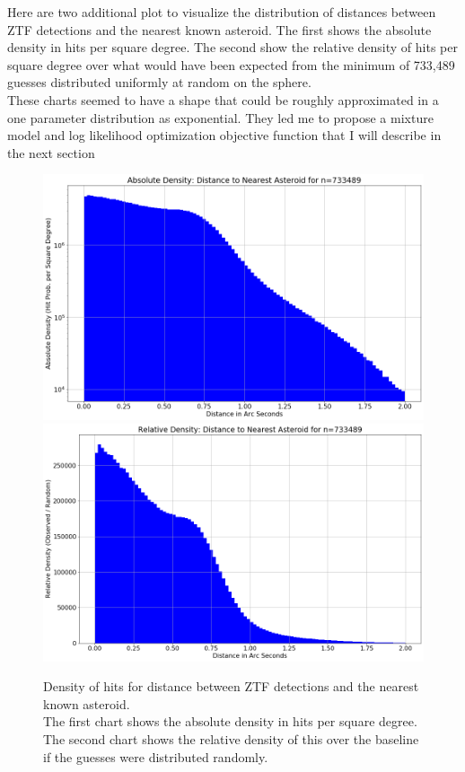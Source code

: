 Here are two additional plot to visualize the distribution of distances between ZTF detections and the nearest known asteroid.
The first shows the absolute density in hits per square degree.
The second show the relative density of hits per square degree over what would have been expected
from the minimum of 733,489 guesses distributed uniformly at random on the sphere. \\
These charts seemed to have a shape that could be roughly approximated in a one parameter distribution as exponential.
They led me to propose a mixture model and log likelihood optimization objective function that I will describe in the next section
\begin{figure}[hbt!]
\begin{center}
\includegraphics[width=1.0\textwidth]{../figs/ztf/nearest_ast_hist_dens_abs.png}
\includegraphics[width=1.0\textwidth]{../figs/ztf/nearest_ast_hist_dens_rel.png}
\caption{Density of hits for distance between ZTF detections and the nearest known asteroid. \\
The first chart shows the absolute density in hits per square degree.\\
The second chart shows the relative density of this over the baseline if the guesses were distributed randomly.}
\end{center}
\end{figure}
\clearpage

